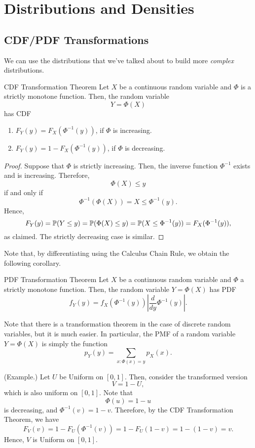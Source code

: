 \documentclass[letterpaper]{article}
\begin{document}
\section{Distributions and Densities}

\subsection{CDF/PDF Transformations}
We can use the distributions that we've talked about to build more \emph{complex} distributions. 

\begin{theorem}{CDF Transformation Theorem}{}
    Let $X$ be a continuous random variable and $\Phi$ is a strictly monotone function. Then, the random variable 
    \[Y = \Phi(X)\]
    has CDF
    \begin{enumerate}
        \item $F_{Y}(y) = F_{X}(\Phi^{-1}(y))$, if $\Phi$ is increasing. 
        \item $F_{Y}(y) = 1 - F_{X}(\Phi^{-1}(y))$, if $\Phi$ is decreasing. 
    \end{enumerate}
\end{theorem}
\begin{mdframed}[]
    \begin{proof}
        Suppose that $\Phi$ is strictly increasing. Then, the inverse function $\Phi^{-1}$ exists and is increasing. Therefore, \[\Phi(X) \leq y\] if and only if \[\Phi^{-1}(\Phi(X)) = X \leq \Phi^{-1}(y).\] Hence, \[F_{Y}(y) = \mathbb{P}(Y \leq y) = \mathbb{P}(\Phi(X) \leq y) = \mathbb{P}(X \leq \Phi^{-1}(y)) = F_{X}(\Phi^{-1}(y)),\] as claimed. The strictly decreasing case is similar. 
    \end{proof}
\end{mdframed}
Note that, by differentiating using the Calculus Chain Rule, we obtain the following corollary. 

\begin{corollary}{PDF Transformation Theorem}{}
    Let $X$ be a continuous random variable and $\Phi$ a strictly monotone function. Then, the random variable $Y = \Phi(X)$ has PDF
    \[f_{Y}(y) = f_{X}(\Phi^{-1}(y)) \left|\frac{d}{dy} \Phi^{-1}(y)\right|.\]
\end{corollary}
Note that there is a transformation theorem in the case of discrete random variables, but it is much easier. In particular, the PMF of a random variable $Y = \Phi(X)$ is simply the function 
\[p_{Y}(y) = \sum_{x: \Phi(x) = y} p_{X}(x).\]

\begin{mdframed}[]
    (Example.) Let $U$ be Uniform on $[0, 1]$. Then, consider the transformed version \[V = 1 - U,\] which is also uniform on $[0, 1]$. Note that \[\Phi(u) = 1 - u\] is decreasing, and $\Phi^{-1}(v) = 1 - v$. Therefore, by the CDF Transformation Theorem, we have 
    \[F_{V}(v) = 1 - F_{U}(\Phi^{-1}(v)) = 1 - F_{U}(1 - v) = 1 - (1 - v) = v.\]
    Hence, $V$ is Uniform on $[0, 1]$. 
\end{mdframed}
\end{document}
